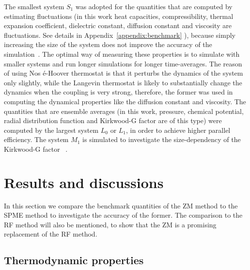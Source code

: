 \documentclass[a4paper,preprint,unsortedaddress,onecolumn,fleqn]{revtex4}
\begin{document}

The smallest system $S_{1}$ was adopted for the quantities that are computed
by estimating fluctuations (in this work heat capacities, compressibility,
thermal expansion coefficient, dielectric constant, diffusion constant and
viscosity are fluctuations. See details in Appendix~\ref{appendix:benchmark}%
), because simply increasing the size of the system does not improve the
accuracy of the simulation~\cite%
{milchev1986fluctuations,ferrenberg1991statistical}. The optimal way of
measuring these properties is to simulate with smaller systems 
and run longer simulations for longer time-averages. The reason of using Nos%
\'{e}-Hoover thermostat is that it perturbs the dynamics of the system only
slightly, while the Langevin thermostat is likely to substantially change
the dynamics when the coupling is very strong, therefore, the former was
used in computing the dynamical properties like the diffusion constant and
viscosity. The quantities that are ensemble averages (in this work,
pressure, chemical potential, radial distribution function and Kirkwood-G
factor are of this type) were computed by the largest system $L_{0}$ or $%
L_{1}$, in order to achieve higher parallel efficiency. The system $M_{1}$
is simulated to investigate the size-dependency of the Kirkwood-G factor~%
\cite{vanderSpoel2006origin}.

\section{Results and discussions}

In this section we compare the benchmark quantities of the ZM method to the
SPME method to investigate the accuracy of the former. The comparison to the
RF method will also be mentioned, to show that the ZM is a promising
replacement of the RF method.

\subsection{Thermodynamic properties}
\end{document}
